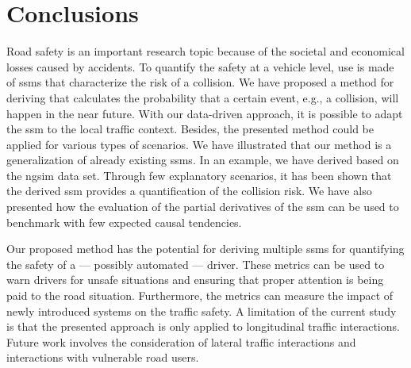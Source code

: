 \section{Conclusions}
\label{sec:conclusions}

Road safety is an important research topic because of the societal and economical losses caused by accidents.
To quantify the safety at a vehicle level, use is made of \acp{ssm} that characterize the risk of a collision. 
We have proposed a method for deriving  that calculates the probability that a certain event, e.g., a collision, will happen in the near future.
With our data-driven approach, it is possible to adapt the \ac{ssm} to the local traffic context.
Besides, the presented method could be applied for various types of scenarios.
We have illustrated that our method is a generalization of already existing \acp{ssm}.
In an example, we have derived  based on the \ac{ngsim} data set.
Through few explanatory scenarios, it has been shown that the derived \ac{ssm} provides a quantification of the collision risk.
We have also presented how the evaluation of the partial derivatives of the \ac{ssm} can be used to benchmark  with few expected causal tendencies.

Our proposed method has the potential for deriving multiple \acp{ssm} for quantifying the safety of a --- possibly automated --- driver.
These metrics can be used to warn drivers for unsafe situations and ensuring that proper attention is being paid to the road situation.
Furthermore, the metrics can measure the impact of newly introduced systems on the traffic safety.
A limitation of the current study is that the presented approach is only applied to longitudinal traffic interactions. 
Future work involves the consideration of lateral traffic interactions and interactions with vulnerable road users. 
